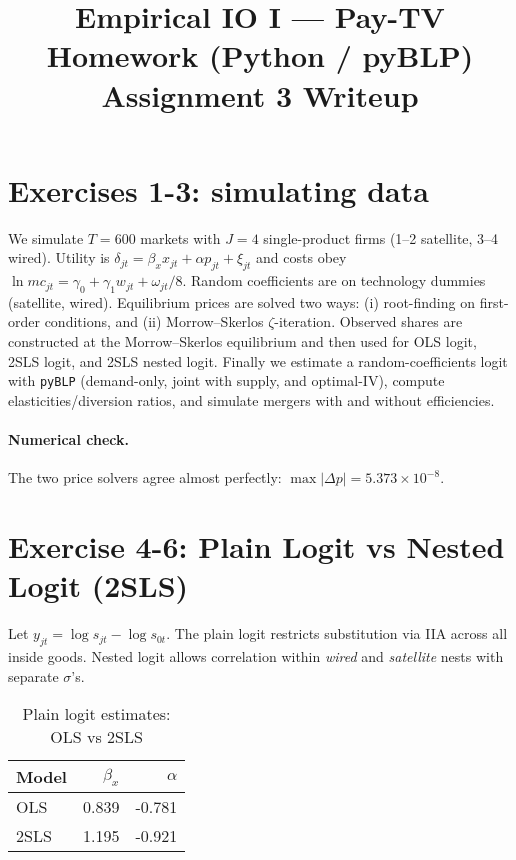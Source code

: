 \documentclass[11pt]{article}
\title{Empirical IO I — Pay-TV Homework (Python / pyBLP) \\ \large Assignment 3 Writeup}
\date{}
\begin{document}
	\maketitle
	
	\section*{Exercises 1-3: simulating data}
	We simulate $T=600$ markets with $J=4$ single-product firms (1--2 satellite, 3--4 wired). Utility is
	$\delta_{jt}=\beta_x x_{jt} + \alpha p_{jt} + \xi_{jt}$ and costs obey $\ln mc_{jt}=\gamma_0+\gamma_1 w_{jt} + \omega_{jt}/8$.
	Random coefficients are on technology dummies (satellite, wired). Equilibrium prices are solved two ways:
	(i) root-finding on first-order conditions, and (ii) Morrow--Skerlos $\zeta$-iteration. Observed shares are
	constructed at the Morrow--Skerlos equilibrium and then used for OLS logit, 2SLS logit, and 2SLS nested logit.
	Finally we estimate a random-coefficients logit with \texttt{pyBLP} (demand-only, joint with supply, and optimal-IV),
	compute elasticities/diversion ratios, and simulate mergers with and without efficiencies.
	
	\paragraph{Numerical check.}
	The two price solvers agree almost perfectly: $\max |\Delta p|=5.373\times 10^{-8}$.
	
	\section*{Exercise 4-6: Plain Logit vs Nested Logit (2SLS)}
	Let $y_{jt}=\log s_{jt}-\log s_{0t}$. The plain logit restricts substitution via IIA across all inside goods.
	Nested logit allows correlation within \emph{wired} and \emph{satellite} nests with separate $\sigma$'s.
	
	\begin{table}[h!]
		\centering
		\caption{Plain logit estimates: OLS vs 2SLS}
		\label{tab:plain}
		\begin{tabular}{lrr}
			\toprule
			Model & $\beta_x$ & $\alpha$ \\
			\midrule
			OLS   & 0.839 & -0.781 \\
			2SLS  & 1.195 & -0.921 \\
			\bottomrule
		\end{tabular}
	\end{table}
	
\end{document}
